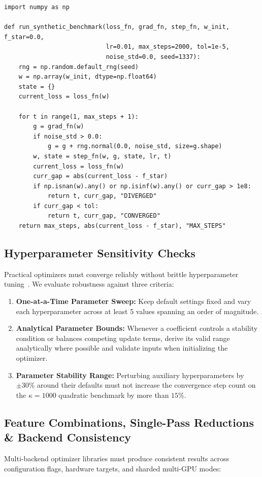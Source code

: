 \documentclass[11pt,a4paper]{article}
\renewcommand{\_}{\origunderscore\allowbreak}
\begin{document}
\begin{lstlisting}[caption={Standard LSO-Eval Stage II: General Synthetic Function Test Runner (v1.1.1)}, label={lst:stage2_runner}]
import numpy as np

def run_synthetic_benchmark(loss_fn, grad_fn, step_fn, w_init, f_star=0.0,
                            lr=0.01, max_steps=2000, tol=1e-5,
                            noise_std=0.0, seed=1337):
    rng = np.random.default_rng(seed)
    w = np.array(w_init, dtype=np.float64)
    state = {}
    current_loss = loss_fn(w)

    for t in range(1, max_steps + 1):
        g = grad_fn(w)
        if noise_std > 0.0:
            g = g + rng.normal(0.0, noise_std, size=g.shape)
        w, state = step_fn(w, g, state, lr, t)
        current_loss = loss_fn(w)
        curr_gap = abs(current_loss - f_star)
        if np.isnan(w).any() or np.isinf(w).any() or curr_gap > 1e8:
            return t, curr_gap, "DIVERGED"
        if curr_gap < tol:
            return t, curr_gap, "CONVERGED"
    return max_steps, abs(current_loss - f_star), "MAX_STEPS"
\end{lstlisting}

\subsection{Hyperparameter Sensitivity Checks}
\noindent
Practical optimizers must converge reliably without brittle hyperparameter tuning~\cite{loshchilov2019adamw}. We evaluate robustness against three criteria:

\begin{enumerate}[label=\textbf{P\arabic*.}, leftmargin=2.4em, itemsep=0.35em]
    \item \textbf{One-at-a-Time Parameter Sweep:} Keep default settings fixed and vary each hyperparameter across at least 5 values spanning an order of magnitude.
    \item \textbf{Analytical Parameter Bounds:} Whenever a coefficient controls a stability condition or balances competing update terms, derive its valid range analytically where possible and validate inputs when initializing the optimizer.
    \item \textbf{Parameter Stability Range:} Perturbing auxiliary hyperparameters by $\pm 30\%$ around their defaults must not increase the convergence step count on the $\kappa = 1000$ quadratic benchmark by more than $15\%$.
\end{enumerate}

\subsection{Feature Combinations, Single-Pass Reductions \& Backend Consistency}
\noindent
Multi-backend optimizer libraries must produce consistent results across configuration flags, hardware targets, and sharded multi-GPU modes:
\end{document}

